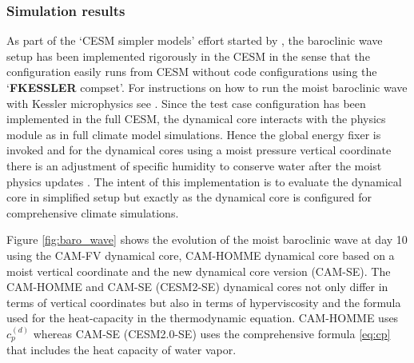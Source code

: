 \documentclass{agujournal}
\begin{document}
{%

\subsubsection{Simulation results}
As part of the `CESM simpler models' effort started by \citet{CESM_SIMPLER_MODELS}, the baroclinic wave setup has been implemented rigorously in the CESM in the sense that the configuration easily runs from CESM without code configurations using the `{\bf{FKESSLER}} compset'. For instructions on how to run the moist baroclinic wave with Kessler microphysics see \citet{FKESSLER}. Since the test case configuration has been implemented in the full CESM, the dynamical core interacts with the physics module as in full climate model simulations. Hence the global energy fixer is invoked \citep{WOHTTV2015JAMES} and for the dynamical cores using a moist pressure vertical coordinate there is an adjustment of specific humidity to conserve water after the moist physics updates \citep[see Section 3.1.6 in ][]{CAM5}. The intent of this implementation is to evaluate the dynamical core in simplified setup but exactly as the dynamical core is configured for comprehensive climate simulations.

Figure \ref{fig:baro_wave} shows the evolution of the moist baroclinic wave at day 10 using the CAM-FV \citep[Finite-Volume; ][]{L2004MWR} dynamical core, CAM-HOMME dynamical core based on a moist vertical coordinate and the new dynamical core version (CAM-SE). The CAM-HOMME and CAM-SE (CESM2-SE) dynamical cores not only differ in terms of vertical coordinates but also in terms of hyperviscosity and the formula used for the heat-capacity in the thermodynamic equation. CAM-HOMME uses $c_p^{(d)}$ whereas CAM-SE (CESM2.0-SE) uses the comprehensive formula \eqref{eq:cp} that includes the heat capacity of water vapor.

}
\end{document}
